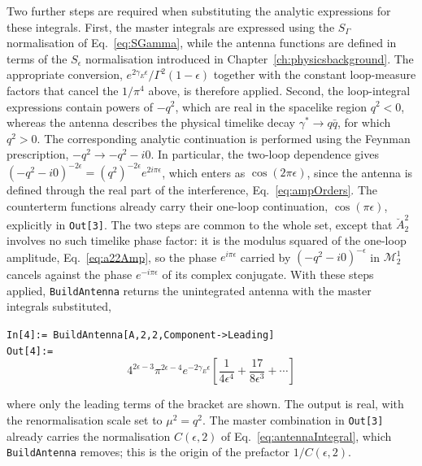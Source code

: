 Two further steps are required when substituting the analytic expressions for these integrals. First,
the master integrals are expressed using the $S_\Gamma$ normalisation of Eq.~\eqref{eq:SGamma}, while
the antenna functions are defined in terms of the $S_\epsilon$ normalisation introduced in
Chapter~\ref{ch:physicsbackground}. The appropriate conversion, $e^{2\gamma_E\epsilon}/\Gamma^2(1-\epsilon)$
together with the constant loop-measure factors that cancel the $1/\pi^4$ above, is therefore applied.
Second, the loop-integral expressions contain powers of $-q^2$, which are real in the spacelike region
$q^2<0$, whereas the antenna describes the physical timelike decay $\gamma^\ast\to q\bar q$, for which
$q^2>0$. The corresponding analytic continuation is performed using the Feynman prescription,
$-q^2\rightarrow -q^2-i0$. In particular, the two-loop dependence gives
$(-q^2-i0)^{-2\epsilon}=(q^2)^{-2\epsilon}e^{2i\pi\epsilon}$, which enters as $\cos(2\pi\epsilon)$, since the antenna is defined through the real part of the
interference, Eq.~\eqref{eq:ampOrders}. The counterterm functions already carry their one-loop
continuation, $\cos(\pi\epsilon)$, explicitly in \texttt{Out[3]}. The two steps are common to the whole
set, except that $\breve A_2^2$ involves no such timelike phase factor: it is the modulus squared of
the one-loop amplitude, Eq.~\eqref{eq:a22Amp}, so the phase $e^{i\pi\epsilon}$ carried by
$(-q^2-i0)^{-\epsilon}$ in $\mathcal M_2^1$ cancels against the phase $e^{-i\pi\epsilon}$ of its
complex conjugate. With these steps applied, \texttt{BuildAntenna} returns the unintegrated antenna
with the master integrals substituted,

\begin{mdframed}[backgroundcolor=gray!10, linewidth=0pt]
\texttt{In[4]:= BuildAntenna[A,2,2,Component->Leading]}\\
\hfill
\texttt{Out[4]:=}
    \begin{equation*}
4^{2\epsilon-3}\pi^{2\epsilon-4}e^{-2\gamma_E\epsilon}\left[\frac1{4\epsilon^4}+\frac{17}{8\epsilon^3}+\cdots\right]
    \end{equation*}
\end{mdframed}

where only the leading terms of the bracket are shown. The output is real, with the renormalisation
scale set to $\mu^2=q^2$. The master combination in \texttt{Out[3]} already carries the normalisation $C(\epsilon,2)$ of Eq.~\eqref{eq:antennaIntegral}, which \texttt{BuildAntenna} removes; this is the origin of the prefactor $1/C(\epsilon,2)$.

